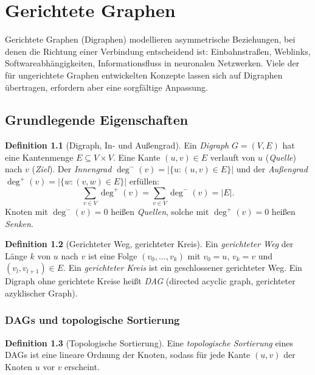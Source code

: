 ﻿\documentclass[a4paper,12pt,openany,oneside]{book}
\theoremstyle{definition}
\newtheorem{definition}{Definition}[chapter]
\theoremstyle{plain}
\theoremstyle{remark}
\begin{document}
\chapter{Gerichtete Graphen}

Gerichtete Graphen (Digraphen) modellieren asymmetrische Beziehungen, bei
denen die Richtung einer Verbindung entscheidend ist: Einbahnstra\ss{}en,
Weblinks, Softwareabh\"angigkeiten, Informationsfluss in neuronalen
Netzwerken. Viele der f\"ur ungerichtete Graphen entwickelten Konzepte
lassen sich auf Digraphen \"ubertragen, erfordern aber eine sorgf\"altige
Anpassung.

\section{Grundlegende Eigenschaften}

\begin{definition}[Digraph, In- und Au\ss{}engrad]
  Ein \emph{Digraph} $G = (V, E)$ hat eine Kantenmenge
  $E \subseteq V \times V$. Eine Kante $(u,v) \in E$ verlauft von $u$
  (\emph{Quelle}) nach $v$ (\emph{Ziel}).
  Der \emph{Innengrad} $\deg^-(v) = |\{u : (u,v) \in E\}|$ und der
  \emph{Au\ss{}engrad} $\deg^+(v) = |\{w : (v,w) \in E\}|$ erf\"ullen:
  \[
    \sum_{v \in V} \deg^+(v) = \sum_{v \in V} \deg^-(v) = |E|.
  \]
  Knoten mit $\deg^-(v)=0$ hei\ss{}en \emph{Quellen}, solche mit
  $\deg^+(v)=0$ hei\ss{}en \emph{Senken}.
\end{definition}

\begin{definition}[Gerichteter Weg, gerichteter Kreis]
  Ein \emph{gerichteter Weg} der L\"ange $k$ von $u$ nach $v$ ist eine
  Folge $(v_0,\ldots,v_k)$ mit $v_0=u$, $v_k=v$ und $(v_l,v_{l+1})\in E$.
  Ein \emph{gerichteter Kreis} ist ein geschlossener gerichteter Weg.
  Ein Digraph ohne gerichtete Kreise hei\ss{}t \emph{DAG}
  (directed acyclic graph, gerichteter azyklischer Graph).
\end{definition}

\subsection{DAGs und topologische Sortierung}

\begin{definition}[Topologische Sortierung]
  Eine \emph{topologische Sortierung} eines DAGs ist eine lineare Ordnung
  der Knoten, sodass f\"ur jede Kante $(u,v)$ der Knoten $u$ vor $v$
  erscheint.
\end{definition}
\end{document}
